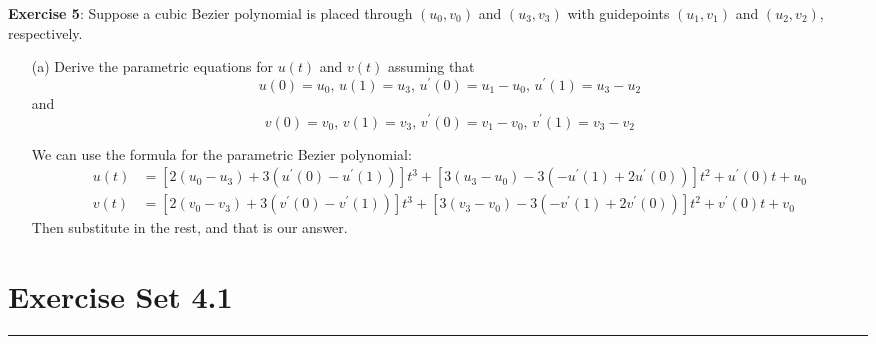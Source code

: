 \documentclass{article}
\begin{document}
\textbf{Exercise 5}: Suppose a cubic Bezier polynomial is placed through $(u_{0}, v_{0})$ and $(u_{3}, v_{3})$ with guidepoints $(u_{1}, v_{1})$ and $(u_{2}, v_{2})$, respectively.
    \begin{itemize}
        \item [(a)] Derive the parametric equations for $u(t)$ and $v(t)$ assuming that 
            \begin{equation*}
                u(0) = u_{0}, \, u(1) = u_{3}, \, u^{\prime}(0) = u_{1} - u_{0}, \, u^{\prime}(1) = u_{3} - u_{2}
            \end{equation*}
        and
            \begin{equation*}
                v(0) = v_{0}, \, v(1) = v_{3}, \, v^{\prime}(0) = v_{1} - v_{0}, \, v^{\prime}(1) = v_{3} - v_{2}
            \end{equation*}
        \begin{answer}
            We can use the formula for the parametric Bezier polynomial:
                \begin{align*}
                    u(t) &= [2(u_{0} - u_{3}) + 3(u^{\prime}(0) - u^{\prime}(1))]t^{3} + [3(u_{3} - u_{0}) - 3(-u^{\prime}(1) + 2u^{\prime}(0))]t^{2} + u^{\prime}(0)t + u_{0} \\
                    v(t) &= [2(v_{0} - v_{3}) + 3(v^{\prime}(0) - v^{\prime}(1))]t^{3} + [3(v_{3} - v_{0}) - 3(-v^{\prime}(1) + 2v^{\prime}(0))]t^{2} + v^{\prime}(0)t + v_{0}    
                \end{align*}
            Then substitute in the rest, and that is our answer.
        \end{answer}
    \end{itemize}

\newpage
\section*{Exercise Set 4.1}
\hrule
\end{document}
